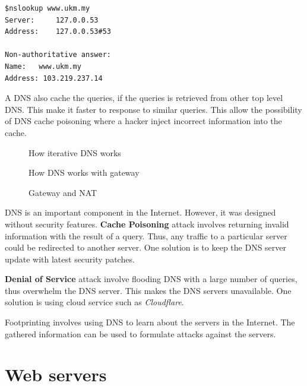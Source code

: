 \documentclass[7x9]{times}
\begin{document}
\begin{verbatim}
$nslookup www.ukm.my
Server:		127.0.0.53
Address:	127.0.0.53#53

Non-authoritative answer:
Name:	www.ukm.my
Address: 103.219.237.14
\end{verbatim}

A DNS also cache the queries, if the queries is retrieved
from other top level DNS. This make it faster to response to
similar queries. This allow the possibility of DNS cache
poisoning where a hacker inject incorrect information into
the cache.

\begin{figure}[ht]
    \centering
    \def\svgwidth{.85\textwidth}
    
    \caption{How iterative DNS works}
\end{figure}

\begin{figure}[ht]
    \centering
    \def\svgwidth{.85\textwidth}
    
    \caption{How DNS works with gateway}
\end{figure}

\begin{figure}[ht]
    \centering
    \def\svgwidth{.85\textwidth}
    
    \caption{Gateway and NAT}
\end{figure}

DNS is an important component in the Internet. However, it
was designed without security features. \textbf{Cache
    Poisoning} attack involves returning invalid information
with the result of a query. Thus, any traffic to a
particular server could be redirected to another server. 
One solution is to keep the DNS server update with latest 
security patches.

\textbf{Denial of Service} attack involve flooding DNS with
a large number of queries, thus overwhelm the DNS server.
This  makes the DNS servers unavailable. One solution is 
using cloud service such as \textit{Cloudflare}.

Footprinting involves using DNS  to learn about the servers
in the Internet. The gathered information can be used to 
formulate attacks against the servers.








\section{Web servers}
\end{document}
